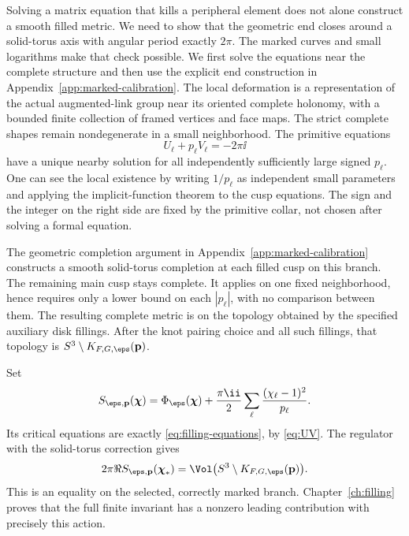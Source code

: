 Solving a matrix equation that kills a peripheral element does not alone construct a smooth filled metric. We need to show that the geometric end closes around a solid-torus axis with angular period exactly $2\pi$. The marked curves and small logarithms make that check possible. We first solve the equations near the complete structure and then use the explicit end construction in Appendix~\ref{app:marked-calibration}.
The local deformation is a representation of the actual augmented-link group near its oriented complete holonomy, with a bounded finite collection of framed vertices and face maps. The strict complete shapes remain nondegenerate in a small neighborhood. The primitive equations
\begin{equation}\label{eq:filling-equations}
 U_\ell+p_\ell V_\ell=-2\pi\ii
\end{equation}
have a unique nearby solution for all independently sufficiently large signed $p_\ell$. One can see the local existence by writing $1/p_\ell$ as independent small parameters and applying the implicit-function theorem to the cusp equations. The sign and the integer on the right side are fixed by the primitive collar, not chosen after solving a formal equation.

The geometric completion argument in Appendix~\ref{app:marked-calibration} constructs a smooth solid-torus completion at each filled cusp on this branch. The remaining main cusp stays complete. It applies on one fixed neighborhood, hence requires only a lower bound on each $|p_\ell|$, with no comparison between them. The resulting complete metric is on the topology obtained by the specified auxiliary disk fillings. After the knot pairing choice and all such fillings, that topology is $S^3\setminus K_{F,G,\eps}(\mathbf p)$.

Set
\begin{equation}\label{eq:filled-action}
 S_{\eps,\mathbf p}(\boldsymbol\chi)=\Phi_\eps(\boldsymbol\chi)
 +\frac{\pi\ii}{2}\sum_\ell\frac{(\chi_\ell-1)^2}{p_\ell}.
\end{equation}
Its critical equations are exactly \eqref{eq:filling-equations}, by \eqref{eq:UV}. The regulator with the solid-torus correction gives
\begin{equation}\label{eq:filled-volume}
 2\pi\Re S_{\eps,\mathbf p}(\boldsymbol\chi_*)
 =\Vol\bigl(S^3\setminus K_{F,G,\eps}(\mathbf p)\bigr).
\end{equation}
This is an equality on the selected, correctly marked branch. Chapter~\ref{ch:filling} proves that the full finite invariant has a nonzero leading contribution with precisely this action.
